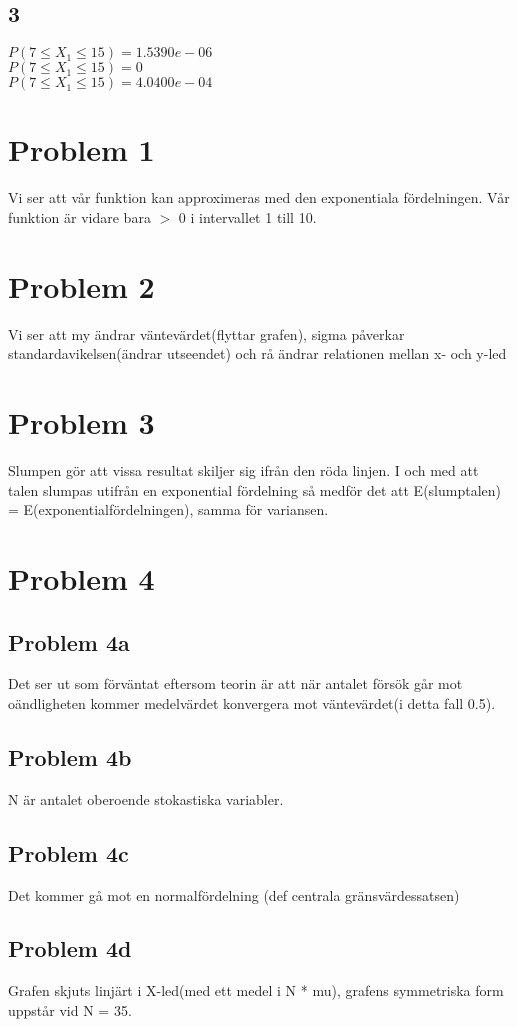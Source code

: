\documentclass{article}
\begin{document}
\subsection*{3}
  $ P(7 \le X_1 \le 15) = 1.5390e-06 $\\ 
  $ P(7 \le X_1 \le 15) = 0 $ \\
  $ P(7 \le X_1 \le 15) = 4.0400e-04 $
   
\section*{Problem 1}
Vi ser att vår funktion kan approximeras med den exponentiala fördelningen. Vår
funktion är vidare bara $>$ 0 i intervallet 1 till 10.
\\
\section*{Problem 2}
Vi ser att my ändrar väntevärdet(flyttar grafen), sigma påverkar
standardavikelsen(ändrar utseendet) och rå ändrar relationen mellan x- och
y-led
\\
\section*{Problem 3}
Slumpen gör att vissa resultat skiljer sig ifrån den röda linjen. I och med att
talen slumpas utifrån en exponential fördelning så medför det att E(slumptalen)
= E(exponentialfördelningen), samma för variansen.

\section*{Problem 4}
\subsection*{Problem 4a}
Det ser ut som förväntat eftersom teorin är att när antalet försök går mot
oändligheten kommer medelvärdet konvergera mot väntevärdet(i detta fall 0.5).
\subsection*{Problem 4b}
N är antalet oberoende stokastiska variabler. 
\subsection*{Problem 4c}
Det kommer gå mot en normalfördelning (def centrala gränsvärdessatsen)
\subsection*{Problem 4d}
Grafen skjuts linjärt i X-led(med ett medel i N * mu), grafens symmetriska form
uppstår vid N = 35.
\end{document}
